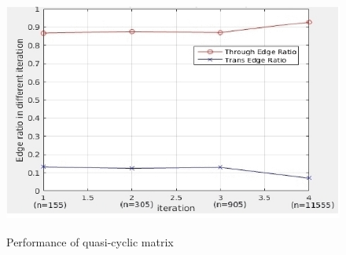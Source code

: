  \begin{figure}[h]
 \begin{center}
    \includegraphics[height=8cm,width=12cm]{qc_part.jpg}
    \caption{Performance of quasi-cyclic matrix} 
    \label{qc_part}
 \end{center}
\end{figure}
